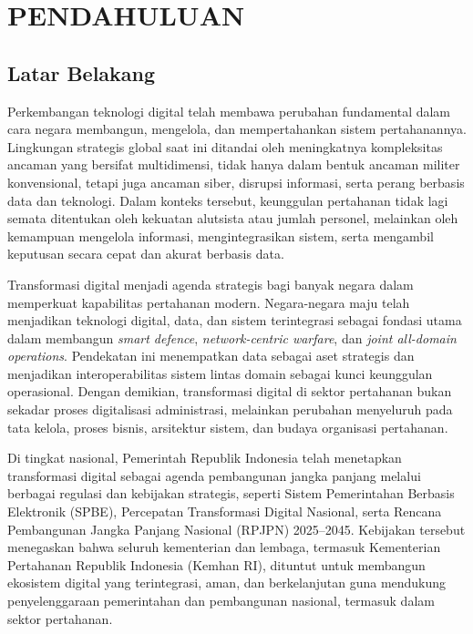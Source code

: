 \cleardoublepage %
\chapter{PENDAHULUAN}
\label{chap:pendahuluan}
\section{Latar Belakang}
Perkembangan teknologi digital telah membawa perubahan fundamental dalam cara negara membangun, mengelola, dan mempertahankan sistem pertahanannya.
Lingkungan strategis global saat ini ditandai oleh meningkatnya kompleksitas ancaman yang bersifat multidimensi, tidak hanya dalam bentuk ancaman militer konvensional, tetapi juga ancaman siber, disrupsi informasi, serta perang berbasis data dan teknologi.
Dalam konteks tersebut, keunggulan pertahanan tidak lagi semata ditentukan oleh kekuatan alutsista atau jumlah personel, melainkan oleh kemampuan mengelola informasi, mengintegrasikan sistem, serta mengambil keputusan secara cepat dan akurat berbasis data.

Transformasi digital menjadi agenda strategis bagi banyak negara dalam memperkuat kapabilitas pertahanan modern.
Negara-negara maju telah menjadikan teknologi digital, data, dan sistem terintegrasi sebagai fondasi utama dalam membangun \textit{smart defence}, \textit{network-centric warfare}, dan \textit{joint all-domain operations}.
Pendekatan ini menempatkan data sebagai aset strategis dan menjadikan interoperabilitas sistem lintas domain sebagai kunci keunggulan operasional.
Dengan demikian, transformasi digital di sektor pertahanan bukan sekadar proses digitalisasi administrasi, melainkan perubahan menyeluruh pada tata kelola, proses bisnis, arsitektur sistem, dan budaya organisasi pertahanan.

Di tingkat nasional, Pemerintah Republik Indonesia telah menetapkan transformasi digital sebagai agenda pembangunan jangka panjang melalui berbagai regulasi dan kebijakan strategis, seperti Sistem Pemerintahan Berbasis Elektronik (SPBE), Percepatan Transformasi Digital Nasional, serta Rencana Pembangunan Jangka Panjang Nasional (RPJPN) 2025–2045.
Kebijakan tersebut menegaskan bahwa seluruh kementerian dan lembaga, termasuk Kementerian Pertahanan Republik Indonesia (Kemhan RI), dituntut untuk membangun ekosistem digital yang terintegrasi, aman, dan berkelanjutan guna mendukung penyelenggaraan pemerintahan dan pembangunan nasional, termasuk dalam sektor pertahanan.

